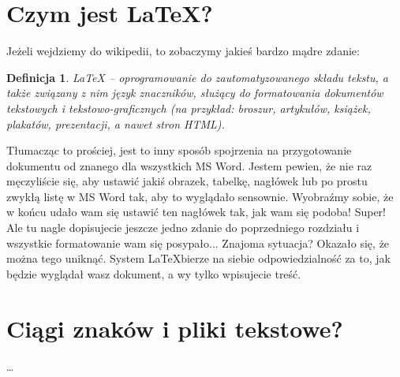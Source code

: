 \documentclass{article}
\newtheorem{definition}{Definicja}
\begin{document}
	
	\section{Czym jest \LaTeX?}
	
	Jeżeli wejdziemy do wikipedii, to zobaczymy jakieś bardzo mądre zdanie: 
	
	\begin{definition}
		LaTeX – oprogramowanie do zautomatyzowanego składu tekstu, a także związany z nim język znaczników, służący do formatowania dokumentów tekstowych i tekstowo-graficznych (na przykład: broszur, artykułów, książek, plakatów, prezentacji, a nawet stron HTML).
	\end{definition}
	
	\noindent Tłumacząc to prościej, jest to inny sposób spojrzenia na przygotowanie dokumentu od znanego dla wszystkich MS Word. Jestem pewien, że nie raz męczyliście się, aby ustawić jakiś obrazek, tabelkę, nagłówek lub po prostu zwykłą listę w MS Word tak, aby to wyglądało sensownie. Wyobraźmy sobie, że w końcu udało wam się ustawić ten nagłówek tak, jak wam się podoba! Super! Ale tu nagle dopisujecie jeszcze jedno zdanie do poprzedniego rozdziału i wszystkie formatowanie wam się posypało... Znajoma sytuacja? Okazało się, że można tego uniknąć. System \LaTeX bierze na siebie odpowiedzialność za to, jak będzie wyglądał wasz dokument, a wy tylko wpisujecie treść. 
	
	
	
	\section{Ciągi znaków i  pliki tekstowe?}
	\ldots
	
\end{document}
